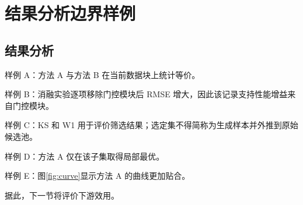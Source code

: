 \chapter{结果分析边界样例}
\section{结果分析}
样例 A：方法 A 与方法 B 在当前数据块上统计等价。

样例 B：消融实验逐项移除门控模块后 RMSE 增大，因此该记录支持性能增益来自门控模块。

样例 C：KS 和 W1 用于评价筛选结果；选定集不得简称为生成样本并外推到原始候选池。

样例 D：方法 A 仅在该子集取得局部最优。

样例 E：图\ref{fig:curve}显示方法 A 的曲线更加贴合。

据此，下一节将评价下游效用。

